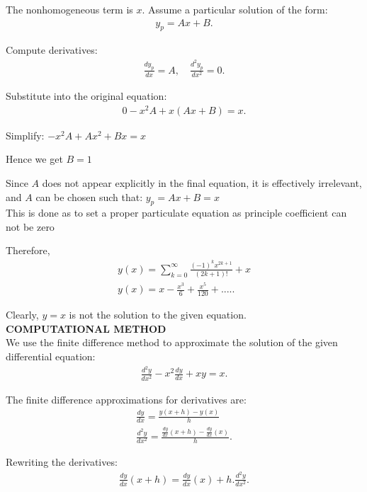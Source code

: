 \documentclass[journal]{IEEEtran}
\begin{document}
The nonhomogeneous term is $x$. Assume a particular solution of the form:
\begin{align}
y_p = Ax + B.
\end{align}

Compute derivatives:
\begin{align}
\frac{dy_p}{dx} = A, \quad \frac{d^2y_p}{dx^2} = 0.
\end{align}

Substitute into the original equation:
\begin{align}
0 - x^2A + x(Ax + B) = x.
\end{align}

Simplify: $-x^2A + Ax^2 + Bx = x$

Hence we get $B=1$

Since $A$ does not appear explicitly in the final equation, it is effectively irrelevant, and $A$ can be chosen such that: $y_p = Ax + B = x$\\
This is done as to set a proper particulate equation as principle coefficient can not be zero


Therefore,
\begin{align}
y(x) = \sum_{k=0}^\infty \frac{(-1)^k x^{2k+1}}{(2k+1)!} + x\\
y(x) = x - \frac{x^3}{6} + \frac{x^5}{120} + .....
\end{align}

Clearly, $y=x$ is not the solution to the given equation.\\



\textbf{COMPUTATIONAL METHOD}\\

We use the finite difference method to approximate the solution of the given differential equation:
\begin{align}
\frac{d^2y}{dx^2} - x^2\frac{dy}{dx} + xy = x.
\end{align}

The finite difference approximations for derivatives are:
\begin{align}
\frac{dy}{dx}=\frac{y(x+h) - y(x)}{h}\\
\frac{d^2y}{dx^2} = \frac{\frac{dy}{dx}(x+h) - \frac{dy}{dx}(x)}{h}.
\end{align}

Rewriting the derivatives:
\begin{align}
\frac{dy}{dx}(x+h) = \frac{dy}{dx}(x) + h.\frac{d^2y}{dx^2}.
\end{align}
\end{document}
